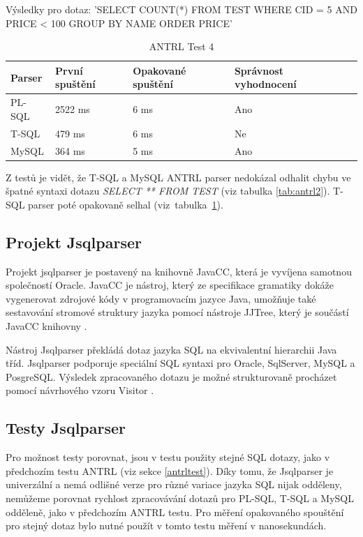 \documentclass[czech,bachelor,public,dept460,male,cpdeclaration,twoside]{diploma}
\begin{document}
\begin{table}[!htbp]
	\centering
	\caption{ANTRL Test 4}
	Výsledky pro dotaz: 'SELECT COUNT(*) FROM TEST WHERE CID = 5 AND PRICE < 100 GROUP BY NAME ORDER PRICE'
	\vskip 0.1cm
	\label{tab:antrl4}
	\begin{tabular}{lllll}
		\toprule
		Parser & První spuštění & Opakované spuštění & Správnost vyhodnocení\\
		\midrule
		PL-SQL & 2522 ms & 6 ms & Ano \\
        T-SQL & 479 ms & 6 ms & Ne \\
        MySQL & 364 ms & 5 ms & Ano \\
		\midrule
	\end{tabular}
\end{table}

Z testů je vidět, že T-SQL a MySQL ANTRL parser nedokázal odhalit chybu ve špatné syntaxi dotazu \textit{SELECT ** FROM TEST} (viz tabulka \ref{tab:antrl2}). T-SQL parser poté opakovaně selhal (viz~tabulka~\ref{tab:antrl4}).


\newpage
\subsection{Projekt Jsqlparser}
Projekt jsqlparser je postavený na knihovně JavaCC, která je vyvíjena samotnou společností Oracle. JavaCC je nástroj, který ze specifikace gramatiky dokáže vygenerovat zdrojové kódy v programovacím jazyce Java, umožňuje také sestavování stromové struktury jazyka pomocí nástroje JJTree, který je součástí JavaCC knihovny \cite{jsql}.


Nástroj Jsqlparser překládá dotaz jazyka SQL na ekvivalentní hierarchii Java tříd. Jsqlparser podporuje speciální SQL syntaxi pro Oracle, SqlServer, MySQL a PosgreSQL. Výsledek zpracovaného dotazu je možné strukturovaně procházet pomocí návrhového vzoru Visitor \cite{jsqld}.


\subsection{Testy Jsqlparser}
Pro možnost testy porovnat, jsou v testu použity stejné SQL dotazy, jako v předchozím testu ANTRL (viz sekce \ref{antrltest}). Díky tomu, že Jsqlparser je univerzální a nemá odlišné verze pro různé variace jazyka SQL nijak odděleny, nemůžeme porovnat rychlost zpracovávání dotazů pro PL-SQL, T-SQL a MySQL odděleně, jako v předchozím ANTRL testu. Pro měření opakovaného spouštění pro stejný dotaz bylo nutné použít v tomto testu měření v nanosekundách.
\end{document}
